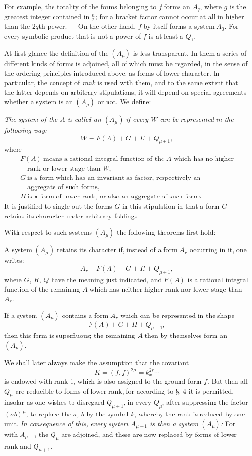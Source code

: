 \documentclass[10pt]{article}
\begin{document}
For example, the totality of the forms belonging to $f$ forms an $A_g$, where $g$ is the greatest integer contained in $\frac n2$; for a bracket factor cannot occur at all in higher than the $2g$th power. --- On the other hand, $f$ by itself forms a system $A_0$. For every symbolic product that is not a power of $f$ is at least a $Q_1$.

At first glance the definition of the $(A_\mu)$ is less transparent. In them a series of different kinds of forms is adjoined, all of which must be regarded, in the sense of the ordering principles introduced above, as forms of lower character. In particular, the concept of \emph{rank} is used with them, and to the same extent that the latter depends on arbitrary stipulations, it will depend on special agreements whether a system is an $(A_\mu)$ or not. We define:

\emph{The system of the $A$ is called an $(A_\mu)$ if every $W$ can be represented in the following way:}
\[
W=F(A)+G+H+Q_{\mu+1},
\]
where
\[
\begin{array}{l}
F(A)\ \text{means a rational integral function of the }A\text{ which has no higher}\\
\quad\text{rank or lower stage than }W,\\[0.15em]
G\ \text{is a form which has an invariant as factor, respectively an}\\
\quad\text{aggregate of such forms},\\[0.15em]
H\ \text{is a form of lower rank, or also an aggregate of such forms.}
\end{array}
\]
It is justified to single out the forms $G$ in this stipulation in that a form $G$ retains its character under arbitrary foldings.

With respect to such systems $(A_\mu)$ the following theorems first hold:

A system $(A_\mu)$ retains its character if, instead of a form $A_r$ occurring in it, one writes:
\[
A_r+F(A)+G+H+Q_{\mu+1},
\]
where $G$, $H$, $Q$ have the meaning just indicated, and $F(A)$ is a rational integral function of the remaining $A$ which has neither higher rank nor lower stage than $A_r$.

If a system $(A_\mu)$ contains a form $A_r$ which can be represented in the shape
\[
F(A)+G+H+Q_{\mu+1},
\]
then this form is superfluous; the remaining $A$ then by themselves form an $(A_\mu)$. ---

We shall later always make the assumption that the covariant
\[
K=(f,f)^{2\mu}=k_x^{2r}\cdots
\]
is endowed with rank 1, which is also assigned to the ground form $f$. But then all $Q_\mu$ are reducible to forms of lower rank, for according to §. 4 it is permitted, insofar as one wishes to disregard $Q_{\mu+1}$, in every $Q_\mu$, after suppressing the factor $(ab)^\mu$, to replace the $a$, $b$ by the symbol $k$, whereby the rank is reduced by one unit. \emph{In consequence of this, every system $A_{\mu-1}$ is then a system $(A_\mu)$:} For with $A_{\mu-1}$ the $Q_\mu$ are adjoined, and these are now replaced by forms of lower rank and $Q_{\mu+1}$.
\end{document}
